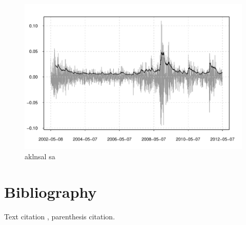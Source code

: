\documentclass{statagroupwp}
\begin{document}
\begin{figure}[t]
\centering
\includegraphics[scale = 0.7]{figures/EWMA}
\caption{aklnsal sa}
\label{fig:coord_y}
\end{figure}



\section{Bibliography}


Text citation \cite{gelfand2003}, parenthesis \citep{gelfand2003} citation.




\end{document}

